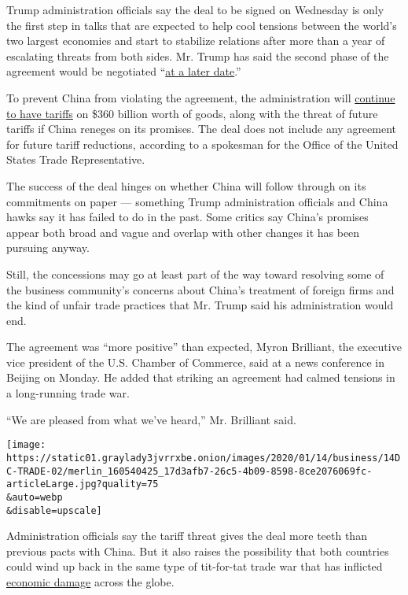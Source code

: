 Trump administration officials say the deal to be signed on Wednesday is
only the first step in talks that are expected to help cool tensions
between the world's two largest economies and start to stabilize
relations after more than a year of escalating threats from both sides.
Mr. Trump has said the second phase of the agreement would be negotiated
``\href{https://www.nytimes3xbfgragh.onion/2019/12/31/us/politics/trump-china-trade-dea.html}{at
a later date}.''

To prevent China from violating the agreement, the administration will
\href{https://www.nytimes3xbfgragh.onion/2020/01/06/business/economy/trade-war-tariffs.html}{continue
to have tariffs} on \$360 billion worth of goods, along with the threat
of future tariffs if China reneges on its promises. The deal does not
include any agreement for future tariff reductions, according to a
spokesman for the Office of the United States Trade Representative.

The success of the deal hinges on whether China will follow through on
its commitments on paper --- something Trump administration officials
and China hawks say it has failed to do in the past. Some critics say
China's promises appear both broad and vague and overlap with other
changes it has been pursuing anyway.

Still, the concessions may go at least part of the way toward resolving
some of the business community's concerns about China's treatment of
foreign firms and the kind of unfair trade practices that Mr. Trump said
his administration would end.

The agreement was ``more positive'' than expected, Myron Brilliant, the
executive vice president of the U.S. Chamber of Commerce, said at a news
conference in Beijing on Monday. He added that striking an agreement had
calmed tensions in a long-running trade war.

``We are pleased from what we've heard,'' Mr. Brilliant said.

\texttt{[image: https://static01.graylady3jvrrxbe.onion/images/2020/01/14/business/14DC-TRADE-02/merlin\_160540425\_17d3afb7-26c5-4b09-8598-8ce2076069fc-articleLarge.jpg?quality=75\\\&auto=webp\\\&disable=upscale]}

Administration officials say the tariff threat gives the deal more teeth
than previous pacts with China. But it also raises the possibility that
both countries could wind up back in the same type of tit-for-tat trade
war that has inflicted
\href{https://www.nytimes3xbfgragh.onion/2020/01/03/business/manufacturing-trump-trade-war.html}{economic
damage} across the globe.

